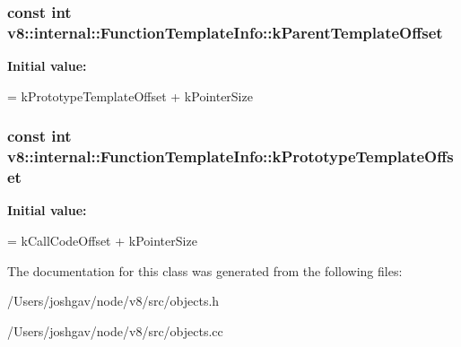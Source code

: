 \subsubsection[{\texorpdfstring{k\+Parent\+Template\+Offset}{kParentTemplateOffset}}]{\setlength{\rightskip}{0pt plus 5cm}const int v8\+::internal\+::\+Function\+Template\+Info\+::k\+Parent\+Template\+Offset\hspace{0.3cm}{\ttfamily [static]}}\hypertarget{classv8_1_1internal_1_1_function_template_info_a55c986ed16644ef6ed27d17c09f2ab3a}{}\label{classv8_1_1internal_1_1_function_template_info_a55c986ed16644ef6ed27d17c09f2ab3a}
{\bfseries Initial value\+:}
\begin{DoxyCode}
=
      kPrototypeTemplateOffset + kPointerSize
\end{DoxyCode}
\subsubsection[{\texorpdfstring{k\+Prototype\+Template\+Offset}{kPrototypeTemplateOffset}}]{\setlength{\rightskip}{0pt plus 5cm}const int v8\+::internal\+::\+Function\+Template\+Info\+::k\+Prototype\+Template\+Offset\hspace{0.3cm}{\ttfamily [static]}}\hypertarget{classv8_1_1internal_1_1_function_template_info_adb0f454aeb8a89f2d58cb96fd79246a8}{}\label{classv8_1_1internal_1_1_function_template_info_adb0f454aeb8a89f2d58cb96fd79246a8}
{\bfseries Initial value\+:}
\begin{DoxyCode}
=
      kCallCodeOffset + kPointerSize
\end{DoxyCode}


The documentation for this class was generated from the following files\+:\begin{DoxyCompactItemize}
\item 
/\+Users/joshgav/node/v8/src/objects.\+h\item 
/\+Users/joshgav/node/v8/src/objects.\+cc\end{DoxyCompactItemize}
